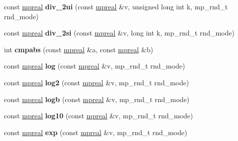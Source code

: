 \begin{DoxyCompactItemize}
const \hyperlink{classmpfr_1_1mpreal}{mpreal} {\bfseries div\+\_\+2ui} (const \hyperlink{classmpfr_1_1mpreal}{mpreal} \&v, unsigned long int k, mp\+\_\+rnd\+\_\+t rnd\+\_\+mode)
\item 
\mbox{\label{classmpfr_1_1mpreal_a4d586a0ae7faa982be27c39fa249fdbd}} 
const \hyperlink{classmpfr_1_1mpreal}{mpreal} {\bfseries div\+\_\+2si} (const \hyperlink{classmpfr_1_1mpreal}{mpreal} \&v, long int k, mp\+\_\+rnd\+\_\+t rnd\+\_\+mode)
\item 
\mbox{\label{classmpfr_1_1mpreal_ac27aec15567e6dc87bd2305636d36aad}} 
int {\bfseries cmpabs} (const \hyperlink{classmpfr_1_1mpreal}{mpreal} \&a, const \hyperlink{classmpfr_1_1mpreal}{mpreal} \&b)
\item 
\mbox{\label{classmpfr_1_1mpreal_a7b075c2ae9b8a9874cc19a7ff00e183b}} 
const \hyperlink{classmpfr_1_1mpreal}{mpreal} {\bfseries log} (const \hyperlink{classmpfr_1_1mpreal}{mpreal} \&v, mp\+\_\+rnd\+\_\+t rnd\+\_\+mode)
\item 
\mbox{\label{classmpfr_1_1mpreal_a50f1e80f8bb61a9ff2200b6a6c02cb1e}} 
const \hyperlink{classmpfr_1_1mpreal}{mpreal} {\bfseries log2} (const \hyperlink{classmpfr_1_1mpreal}{mpreal} \&v, mp\+\_\+rnd\+\_\+t rnd\+\_\+mode)
\item 
\mbox{\label{classmpfr_1_1mpreal_a7c164841cb8a4d28e91a41f0eee03cb4}} 
const \hyperlink{classmpfr_1_1mpreal}{mpreal} {\bfseries logb} (const \hyperlink{classmpfr_1_1mpreal}{mpreal} \&v, mp\+\_\+rnd\+\_\+t rnd\+\_\+mode)
\item 
\mbox{\label{classmpfr_1_1mpreal_a61bbe6916ff7d383990738ecb4e0aa78}} 
const \hyperlink{classmpfr_1_1mpreal}{mpreal} {\bfseries log10} (const \hyperlink{classmpfr_1_1mpreal}{mpreal} \&v, mp\+\_\+rnd\+\_\+t rnd\+\_\+mode)
\item 
\mbox{\label{classmpfr_1_1mpreal_abf9dc90b44b12c1b6aa0fe57bd088e8b}} 
const \hyperlink{classmpfr_1_1mpreal}{mpreal} {\bfseries exp} (const \hyperlink{classmpfr_1_1mpreal}{mpreal} \&v, mp\+\_\+rnd\+\_\+t rnd\+\_\+mode)
\item 
\mbox{\label{classmpfr_1_1mpreal_ae7d3bfbc39a119a80884a6816572b80c}} 

\end{DoxyCompactItemize}
